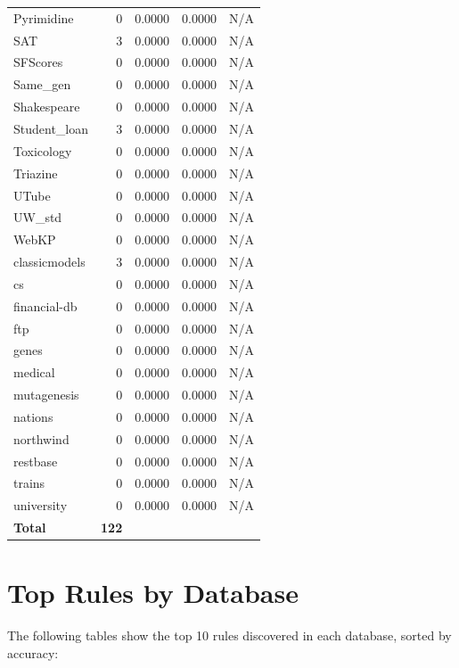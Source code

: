 \documentclass[11pt,a4paper]{article}
\begin{document}
\begin{table}[h!]
\begin{tabular}{|l|r|r|r|r|}
Pyrimidine & 0 & 0.0000 & 0.0000 & N/A \\
SAT & 3 & 0.0000 & 0.0000 & N/A \\
SFScores & 0 & 0.0000 & 0.0000 & N/A \\
Same_gen & 0 & 0.0000 & 0.0000 & N/A \\
Shakespeare & 0 & 0.0000 & 0.0000 & N/A \\
Student_loan & 3 & 0.0000 & 0.0000 & N/A \\
Toxicology & 0 & 0.0000 & 0.0000 & N/A \\
Triazine & 0 & 0.0000 & 0.0000 & N/A \\
UTube & 0 & 0.0000 & 0.0000 & N/A \\
UW_std & 0 & 0.0000 & 0.0000 & N/A \\
WebKP & 0 & 0.0000 & 0.0000 & N/A \\
classicmodels & 3 & 0.0000 & 0.0000 & N/A \\
cs & 0 & 0.0000 & 0.0000 & N/A \\
financial-db & 0 & 0.0000 & 0.0000 & N/A \\
ftp & 0 & 0.0000 & 0.0000 & N/A \\
genes & 0 & 0.0000 & 0.0000 & N/A \\
medical & 0 & 0.0000 & 0.0000 & N/A \\
mutagenesis & 0 & 0.0000 & 0.0000 & N/A \\
nations & 0 & 0.0000 & 0.0000 & N/A \\
northwind & 0 & 0.0000 & 0.0000 & N/A \\
restbase & 0 & 0.0000 & 0.0000 & N/A \\
trains & 0 & 0.0000 & 0.0000 & N/A \\
university & 0 & 0.0000 & 0.0000 & N/A \\
\hline
\textbf{Total} & \textbf{122} & & & \\
\hline
\end{tabular}
\end{table}

\section{Top Rules by Database}
The following tables show the top 10 rules discovered in each database, sorted by accuracy:
\end{document}
